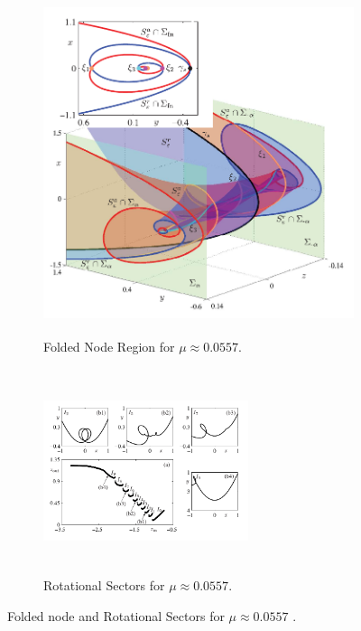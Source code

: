 %

\begin{figure}[h!]
	\centering
	\begin{subfigure}[t]{0.45\textwidth}
		\centering
			\includegraphics[height=10cm,width=10cm]{Images/MMO-spirals}
		\caption{Folded Node Region for $\mu \approx0.0557$.}
		\label{fig: MMo1pic}
	\end{subfigure}
	\hfill
	\begin{subfigure}[t]{0.45\textwidth}
			\includegraphics[height=6cm,width=6cm]{Images/MMO2}
		\caption{Rotational Sectors for $\mu \approx 0.0557$.}
		\label{fig: MMo2pic} 
	\end{subfigure}
\caption{Folded node and Rotational Sectors for $\mu \approx 0.0557$ \citep{MMO}.}
\end{figure}\newpage


